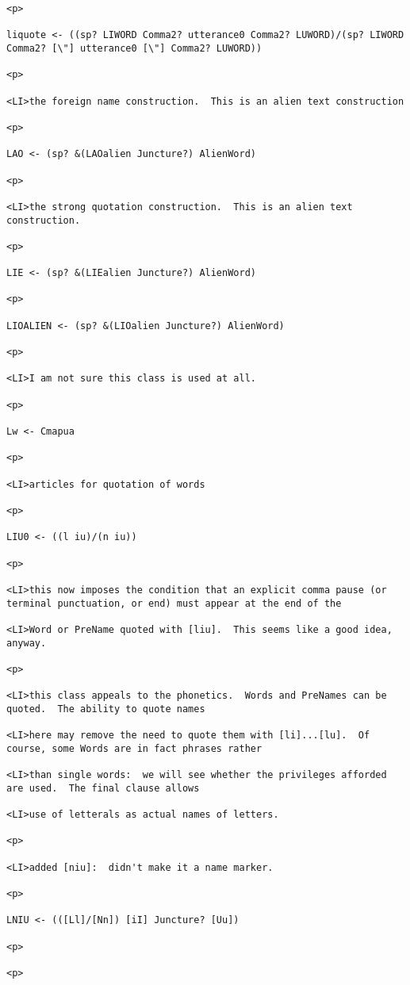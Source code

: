 \documentclass[12pt]{article}
\begin{document}
\begin{lstlisting}
<p>

liquote <- ((sp? LIWORD Comma2? utterance0 Comma2? LUWORD)/(sp? LIWORD Comma2? [\"] utterance0 [\"] Comma2? LUWORD))

<p>

<LI>the foreign name construction.  This is an alien text construction

<p>

LAO <- (sp? &(LAOalien Juncture?) AlienWord)

<p>

<LI>the strong quotation construction.  This is an alien text construction.

<p>

LIE <- (sp? &(LIEalien Juncture?) AlienWord)

<p>

LIOALIEN <- (sp? &(LIOalien Juncture?) AlienWord)

<p>

<LI>I am not sure this class is used at all.

<p>

Lw <- Cmapua

<p>

<LI>articles for quotation of words

<p>

LIU0 <- ((l iu)/(n iu))

<p>

<LI>this now imposes the condition that an explicit comma pause (or terminal punctuation, or end) must appear at the end of the

<LI>Word or PreName quoted with [liu].  This seems like a good idea, anyway.

<p>

<LI>this class appeals to the phonetics.  Words and PreNames can be quoted.  The ability to quote names

<LI>here may remove the need to quote them with [li]...[lu].  Of course, some Words are in fact phrases rather

<LI>than single words:  we will see whether the privileges afforded are used.  The final clause allows

<LI>use of letterals as actual names of letters.

<p>

<LI>added [niu]:  didn't make it a name marker.

<p>

LNIU <- (([Ll]/[Nn]) [iI] Juncture? [Uu])

<p>

<p>


\end{lstlisting}
\end{document}
